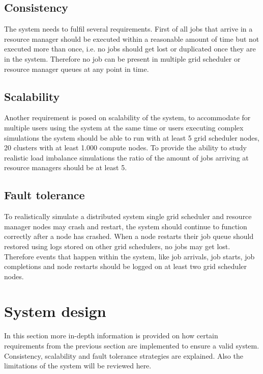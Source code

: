 \documentclass[a4paper]{article}
\begin{document}
\subsection{Consistency}
The system needs to fulfil several requirements. 
First of all jobs that arrive in a resource manager should be executed within a reasonable amount of time but not executed more than once, i.e. no jobs should get lost or duplicated once they are in the system. 
Therefore no job can be present in multiple grid scheduler or resource manager queues at any point in time. 

\subsection{Scalability}
Another requirement is posed on scalability of the system, 
to accommodate for multiple users using the system at the same time or users executing complex simulations the system should be able to run with at least 5 grid scheduler nodes, 20 clusters with at least 1.000 compute nodes. 
To provide the ability to study realistic load imbalance simulations the ratio of the amount of jobs arriving at resource managers should be at least 5. \\
\subsection{Fault tolerance}
To realistically simulate a distributed system single grid scheduler and resource manager nodes may crash and restart, the system should continue to function correctly after a node has crashed. 
When a node restarts their job queue should restored using logs stored on other grid schedulers, no jobs may get lost. 
Therefore events that happen within the system, like job arrivals, job starts, job completions and node restarts should be logged on at least two grid scheduler nodes. 


\section{System design}
In this section more in-depth information is provided on how certain requirements from the previous section are implemented to ensure a valid system.
Consistency, scalability and fault tolerance strategies are explained. 
Also the limitations of the system will be reviewed here.
\end{document}
